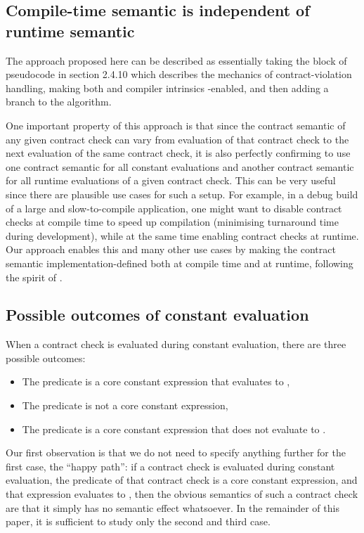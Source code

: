\subsection{Compile-time semantic is independent of runtime semantic}

The approach proposed here can be described as essentially taking the block of pseudocode in \cite{P2900R1} section 2.4.10 which describes the mechanics of contract-violation handling, making both  and  compiler intrinsics -enabled, and then adding a  branch to the algorithm.

One important property of this approach is that since the contract semantic of any given contract check can vary from evaluation of that contract check to the next evaluation of the same contract check, it is also perfectly confirming to use one contract semantic for all constant evaluations and another contract semantic for all runtime evaluations of a given contract check. This can be very useful since there are plausible use cases for such a setup. For example, in a debug build of a large and slow-to-compile application, one might want to disable contract checks at compile time to speed up compilation (minimising turnaround time during development), while at the same time enabling contract checks at runtime. Our approach enables this and many other use cases by making the contract semantic implementation-defined both at compile time and at runtime, following the spirit of \cite{P2877R0}.

\subsection{Possible outcomes of constant evaluation}

When a contract check is evaluated during constant evaluation, there are three possible outcomes:
\begin{itemize}
\item The predicate is a core constant expression that evaluates to ,
\item The predicate is not a core constant expression,
\item The predicate is a core constant expression that does not evaluate to .
\end{itemize}
Our first observation is that we do not need to specify anything further for the first case, the ``happy path'': if a contract check is evaluated during constant evaluation, the predicate of that contract check is a core constant expression, and that expression evaluates to , then the obvious semantics of such a contract check are that it simply has no semantic effect whatsoever. In the remainder of this paper, it is sufficient to study only the second and third case.

